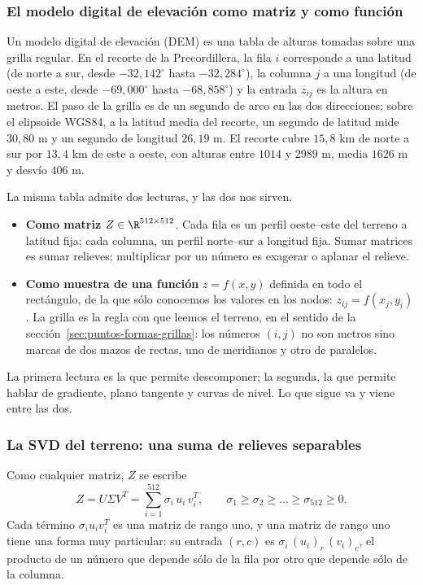 \subsubsection{El modelo digital de elevación como matriz y como función}

Un modelo digital de elevación (DEM) es una tabla de alturas tomadas sobre una grilla
regular. En el recorte de la Precordillera, la fila \(i\) corresponde a una latitud (de norte
a sur, desde \(-32{,}142^\circ\) hasta \(-32{,}284^\circ\)), la columna \(j\) a una longitud
(de oeste a este, desde \(-69{,}000^\circ\) hasta \(-68{,}858^\circ\)) y la entrada
\(z_{ij}\) es la altura en metros. El paso de la grilla es de un segundo de arco en las dos
direcciones; sobre el elipsoide WGS84, a la latitud media del recorte, un segundo de latitud
mide \(30{,}80\) m y un segundo de longitud \(26{,}19\) m. El recorte cubre
\(15{,}8\) km de norte a sur por \(13{,}4\) km de este a oeste, con alturas entre
\(1014\) y \(2989\) m, media \(1626\) m y desvío \(406\) m.

La misma tabla admite dos lecturas, y las dos nos sirven.

\begin{itemize}
  \item \textbf{Como matriz} \(Z\in\R^{512\times512}\). Cada fila es un perfil
  oeste--este del terreno a latitud fija; cada columna, un perfil norte--sur a longitud fija.
  Sumar matrices es sumar relieves; multiplicar por un número es exagerar o aplanar el
  relieve.
  \item \textbf{Como muestra de una función} \(z=f(x,y)\) definida en todo el rectángulo,
  de la que sólo conocemos los valores en los nodos: \(z_{ij}=f(x_j,y_i)\). La grilla es
  la regla con que leemos el terreno, en el sentido de la
  sección~\ref{sec:puntos-formas-grillas}: los números \((i,j)\) no son metros sino marcas
  de dos mazos de rectas, uno de meridianos y otro de paralelos.
\end{itemize}

La primera lectura es la que permite descomponer; la segunda, la que permite hablar de
gradiente, plano tangente y curvas de nivel. Lo que sigue va y viene entre las dos.

\subsubsection{La SVD del terreno: una suma de relieves separables}\label{sec:svd-dem-separables}

Como cualquier matriz, \(Z\) se escribe
\[
  Z=U\Sigma V^T=\sum_{i=1}^{512}\sigma_i\,u_i\,v_i^T ,
  \qquad \sigma_1\ge\sigma_2\ge\dots\ge\sigma_{512}\ge0 .
\]
Cada término \(\sigma_iu_iv_i^T\) es una matriz de rango uno, y una matriz de rango uno
tiene una forma muy particular: su entrada \((r,c)\) es \(\sigma_i\,(u_i)_r\,(v_i)_c\), el
producto de un número que depende sólo de la fila por otro que depende sólo de la columna.

